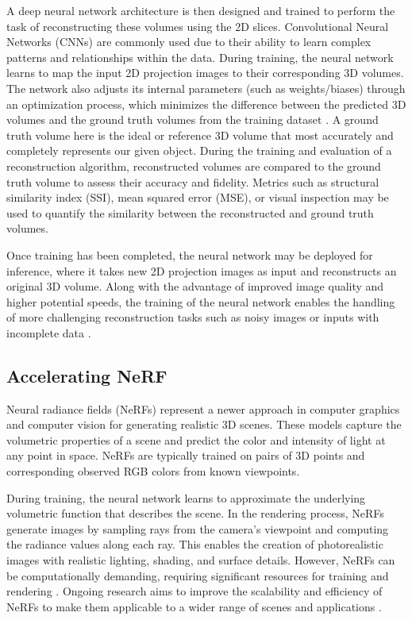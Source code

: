 A deep neural network architecture is then designed and trained to perform the task of reconstructing these volumes using the 2D slices. Convolutional Neural Networks (CNNs) are commonly used due to their ability to learn complex patterns and relationships within the data. During training, the neural network learns to map the input 2D projection images to their corresponding 3D volumes. The network also adjusts its internal parameters (such as weights/biases) through an optimization process, which minimizes the difference between the predicted 3D volumes and the ground truth volumes from the training dataset \cite{Knapitsch17}. A ground truth volume here is the ideal or reference 3D volume that most accurately and completely represents our given object. During the training and evaluation of a reconstruction algorithm, reconstructed volumes are compared to the ground truth volume to assess their accuracy and fidelity. Metrics such as structural similarity index (SSI), mean squared error (MSE), or visual inspection may be used to quantify the similarity between the reconstructed and ground truth volumes.

Once training has been completed, the neural network may be deployed for inference, where it takes new 2D projection images as input and reconstructs an original 3D volume. Along with the advantage of improved image quality and higher potential speeds, the training of the neural network enables the handling of more challenging reconstruction tasks such as noisy images or inputs with incomplete data \cite{Mildenhall20}.

\subsection{Accelerating NeRF}

Neural radiance fields (NeRFs) \cite{Aliev19} represent a newer approach in computer graphics and computer vision for generating realistic 3D scenes. These models capture the volumetric properties of a scene and predict the color and intensity of light at any point in space. NeRFs are typically trained on pairs of 3D points and corresponding observed RGB colors from known viewpoints. 

During training, the neural network learns to approximate the underlying volumetric function that describes the scene. In the rendering process, NeRFs generate images by sampling rays from the camera's viewpoint and computing the radiance values along each ray. This enables the creation of photorealistic images with realistic lighting, shading, and surface details. However, NeRFs can be computationally demanding, requiring significant resources for training and rendering \cite{Reiser21}. Ongoing research aims to improve the scalability and efficiency of NeRFs to make them applicable to a wider range of scenes and applications \cite{Barron21, Garbin21, Kerbl23}.


